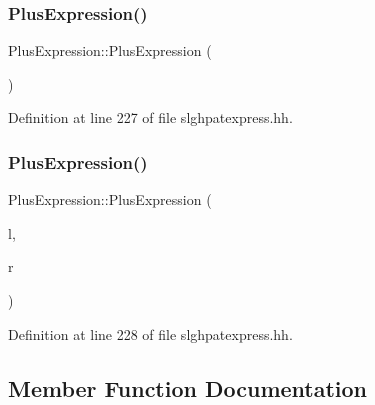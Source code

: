 \subsubsection{\texorpdfstring{PlusExpression()}{PlusExpression()}\hspace{0.1cm}{\footnotesize\ttfamily [1/2]}}
{\footnotesize\ttfamily Plus\+Expression\+::\+Plus\+Expression (\begin{DoxyParamCaption}\item[{void}]{ }\end{DoxyParamCaption})\hspace{0.3cm}{\ttfamily [inline]}}



Definition at line 227 of file slghpatexpress.\+hh.

\mbox{\label{class_plus_expression_a401b649b576191e05c33e0050a5a8208}} 
\subsubsection{\texorpdfstring{PlusExpression()}{PlusExpression()}\hspace{0.1cm}{\footnotesize\ttfamily [2/2]}}
{\footnotesize\ttfamily Plus\+Expression\+::\+Plus\+Expression (\begin{DoxyParamCaption}\item[{\mbox{\hyperlink{class_pattern_expression}{Pattern\+Expression}} $\ast$}]{l,  }\item[{\mbox{\hyperlink{class_pattern_expression}{Pattern\+Expression}} $\ast$}]{r }\end{DoxyParamCaption})\hspace{0.3cm}{\ttfamily [inline]}}



Definition at line 228 of file slghpatexpress.\+hh.



\subsection{Member Function Documentation}
\mbox{\label{class_plus_expression_a28a9c3cb49bb8515b6edc4e191beecfa}} 
